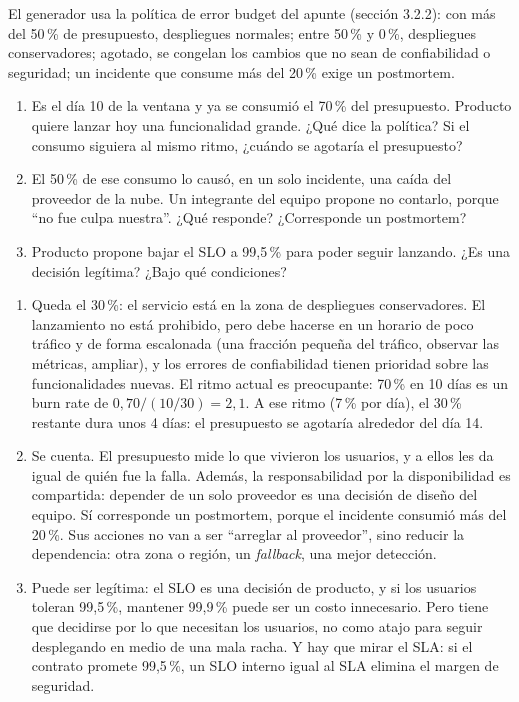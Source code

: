 \documentclass[variant=guia,cover=institutional,mode=screen]{ua-engineering-v6-article}
\begin{document}
\begin{uaexercise}
El generador usa la política de error budget del apunte (sección 3.2.2): con más del 50\,\% de presupuesto, despliegues normales; entre 50\,\% y 0\,\%, despliegues conservadores; agotado, se congelan los cambios que no sean de confiabilidad o seguridad; un incidente que consume más del 20\,\% exige un postmortem.
\begin{enumerate}
\item Es el día 10 de la ventana y ya se consumió el 70\,\% del presupuesto. Producto quiere lanzar hoy una funcionalidad grande. ¿Qué dice la política? Si el consumo siguiera al mismo ritmo, ¿cuándo se agotaría el presupuesto?
\item El 50\,\% de ese consumo lo causó, en un solo incidente, una caída del proveedor de la nube. Un integrante del equipo propone no contarlo, porque ``no fue culpa nuestra''. ¿Qué responde? ¿Corresponde un postmortem?
\item Producto propone bajar el SLO a 99,5\,\% para poder seguir lanzando. ¿Es una decisión legítima? ¿Bajo qué condiciones?
\end{enumerate}
\end{uaexercise}
\begin{uaanswer}
\begin{enumerate}
\item Queda el 30\,\%: el servicio está en la zona de despliegues conservadores. El lanzamiento no está prohibido, pero debe hacerse en un horario de poco tráfico y de forma escalonada (una fracción pequeña del tráfico, observar las métricas, ampliar), y los errores de confiabilidad tienen prioridad sobre las funcionalidades nuevas. El ritmo actual es preocupante: 70\,\% en 10 días es un burn rate de $0{,}70 / (10/30) = 2{,}1$. A ese ritmo (7\,\% por día), el 30\,\% restante dura unos 4 días: el presupuesto se agotaría alrededor del día 14.
\item Se cuenta. El presupuesto mide lo que vivieron los usuarios, y a ellos les da igual de quién fue la falla. Además, la responsabilidad por la disponibilidad es compartida: depender de un solo proveedor es una decisión de diseño del equipo. Sí corresponde un postmortem, porque el incidente consumió más del 20\,\%. Sus acciones no van a ser ``arreglar al proveedor'', sino reducir la dependencia: otra zona o región, un \emph{fallback}, una mejor detección.
\item Puede ser legítima: el SLO es una decisión de producto, y si los usuarios toleran 99,5\,\%, mantener 99,9\,\% puede ser un costo innecesario. Pero tiene que decidirse por lo que necesitan los usuarios, no como atajo para seguir desplegando en medio de una mala racha. Y hay que mirar el SLA: si el contrato promete 99,5\,\%, un SLO interno igual al SLA elimina el margen de seguridad.
\end{enumerate}
\end{uaanswer}
\end{document}
